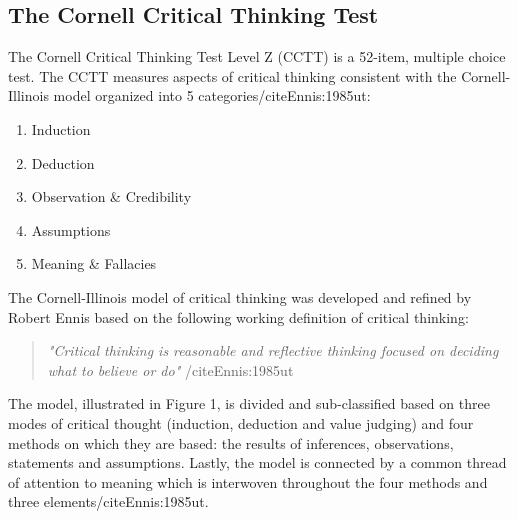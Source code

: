 \subsection{The Cornell Critical Thinking Test}

The Cornell Critical Thinking Test Level Z (CCTT) is a 52-item, multiple choice test. The CCTT measures aspects of critical thinking consistent with the Cornell-Illinois model organized into 5 categories/cite{Ennis:1985ut}:

\begin{enumerate}
\item Induction
\item Deduction
\item Observation & Credibility
\item Assumptions
\item Meaning & Fallacies
\end{enumerate}

The Cornell-Illinois model of critical thinking was developed and refined by Robert Ennis based on the following working definition of critical thinking:

\begin{quote}
\textit{"Critical thinking is reasonable and reflective thinking focused on deciding what to believe or do"} /cite{Ennis:1985ut}
\end{quote}

The model, illustrated in Figure 1, is divided and sub-classified based on three modes of critical thought (induction, deduction and value judging) and four methods on which they are based: the results of inferences, observations, statements and assumptions. Lastly, the model is connected by a common thread of attention to meaning which is interwoven throughout the four methods and three elements/cite{Ennis:1985ut}. 

